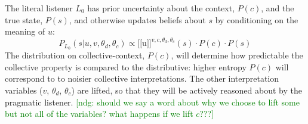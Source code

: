 \documentclass[linguex]{sp}
\newcommand{\sem}[1]{\mbox{$[\![$#1$]\!]$}}
\newcommand{\lam}{$\lambda$}
\newcommand{\ndg}[1]{\textcolor{Green}{[ndg: #1]}}
\begin{document}
%
%


The literal listener $L_{0}$ has prior uncertainty about the context, $P(c)$, and the true state, $P(s)$, and otherwise updates beliefs about $s$ by conditioning on the meaning of $u$: 
$$P_{L_{0}}(s|u,v,\theta_d,\theta_c) \propto \sem{u}^{v,c,\theta_d,\theta_c}(s) \cdot P(c) \cdot P(s)$$
The distribution on collective-context, $P(c)$, will determine how predictable the collective property is compared to the distributive: higher entropy $P(c)$ will correspond to to noisier collective interpretations.
The other interpretation variables ($v$, $\theta_d$, $\theta_c$) are lifted, so that they will be actively reasoned about by the pragmatic listener.
\ndg{should we say a word about why we choose to lift some but not all of the variables? what happens if we lift $c$???}
\end{document}
